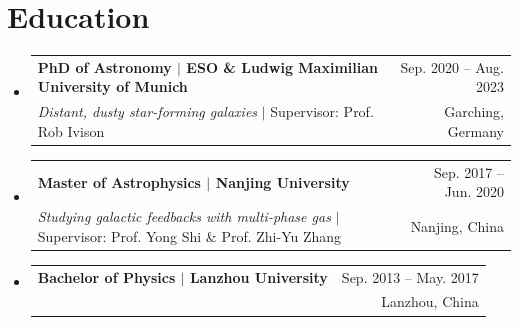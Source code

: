 \documentclass[A4,11pt]{article}
\makeatletter
\newcommand{\CVSubheading}[4]{
  \vspace{-2pt}\item
    \begin{tabular*}{0.97\textwidth}[t]{l@{\extracolsep{\fill}}r}
      \textbf{#1} & #2 \\
      \small#3 & \small #4 \\
    \end{tabular*}\vspace{-7pt}
}
\newcommand{\CVSubHeadingListStart}{\begin{itemize}[leftmargin=0.5cm, label={}]}
\newcommand{\CVSubHeadingListEnd}{\end{itemize}}
\makeatother
\begin{document}

\section{Education}
  \CVSubHeadingListStart
    \CVSubheading
    {{PhD of Astronomy $|$ {\small{ESO \& Ludwig Maximilian University of Munich}}}}{Sep. 2020 -- Aug. 2023}
     {\emph{Distant, dusty star-forming galaxies} $|$ Supervisor: Prof. Rob Ivison}{Garching, Germany}
    \CVSubheading
      {{Master of Astrophysics $|$ {\small{Nanjing University}}}}{Sep. 2017 -- Jun. 2020}
      {\emph{Studying galactic feedbacks with multi-phase gas} $|$ Supervisor: Prof. Yong Shi \& Prof. Zhi-Yu Zhang}{Nanjing, China}
    \CVSubheading
      {{Bachelor of Physics $|$ {\small{Lanzhou University}}}}{Sep. 2013 -- May. 2017}
      {\emph{}}{Lanzhou, China}
  \CVSubHeadingListEnd
\end{document}
